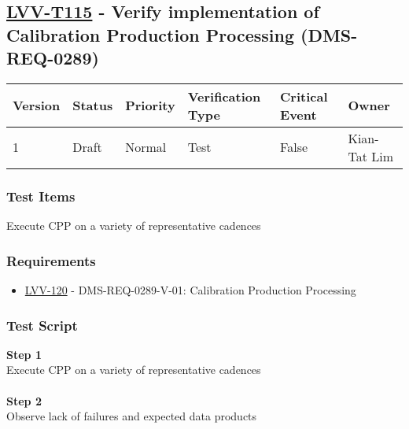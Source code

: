 \hypertarget{lvv-t115---verify-implementation-of-calibration-production-processing-dms-req-0289}{%
\subsection{\texorpdfstring{\href{https://jira.lsstcorp.org/secure/Tests.jspa\#/testCase/LVV-T115}{LVV-T115}
- Verify implementation of Calibration Production Processing
(DMS-REQ-0289)}{LVV-T115 - Verify implementation of Calibration Production Processing (DMS-REQ-0289)}}\label{lvv-t115---verify-implementation-of-calibration-production-processing-dms-req-0289}}

\begin{longtable}[]{@{}llllll@{}}
\toprule
Version & Status & Priority & Verification Type & Critical Event &
Owner\tabularnewline
\midrule
\endhead
1 & Draft & Normal & Test & False & Kian-Tat Lim\tabularnewline
\bottomrule
\end{longtable}

\hypertarget{test-items-15}{%
\subsubsection{Test Items}\label{test-items-15}}

Execute CPP on a variety of representative cadences

\hypertarget{requirements-15}{%
\subsubsection{Requirements}\label{requirements-15}}

\begin{itemize}
\tightlist
\item
  \href{https://jira.lsstcorp.org/browse/LVV-120}{LVV-120} -
  DMS-REQ-0289-V-01: Calibration Production Processing
\end{itemize}

\hypertarget{test-script-15}{%
\subsubsection{Test Script}\label{test-script-15}}

\textbf{Step 1}\\
Execute CPP on a variety of representative cadences\\
~\\
\textbf{Step 2}\\
Observe lack of failures and expected data products\\
~\\

